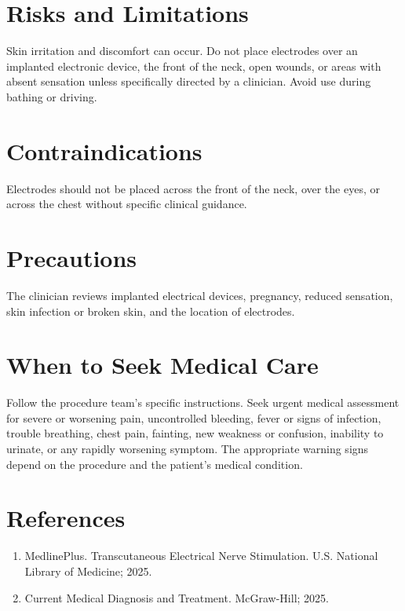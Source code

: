 \section*{Risks and Limitations}
Skin irritation and discomfort can occur. Do not place electrodes over an implanted electronic device, the front of the neck, open wounds, or areas with absent sensation unless specifically directed by a clinician. Avoid use during bathing or driving.

\section*{Contraindications}
Electrodes should not be placed across the front of the neck, over the eyes, or across the chest without specific clinical guidance.

\section*{Precautions}
The clinician reviews implanted electrical devices, pregnancy, reduced sensation, skin infection or broken skin, and the location of electrodes.

\section*{When to Seek Medical Care}
Follow the procedure team's specific instructions. Seek urgent medical assessment for severe or worsening pain, uncontrolled bleeding, fever or signs of infection, trouble breathing, chest pain, fainting, new weakness or confusion, inability to urinate, or any rapidly worsening symptom. The appropriate warning signs depend on the procedure and the patient's medical condition.

\section*{References}
\begin{enumerate}
  \item MedlinePlus. Transcutaneous Electrical Nerve Stimulation. U.S. National Library of Medicine; 2025.
  \item Current Medical Diagnosis and Treatment. McGraw-Hill; 2025.
\end{enumerate}
\clearpage
